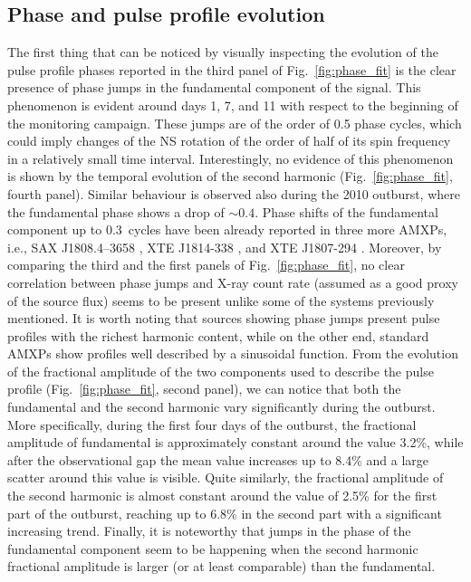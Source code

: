 \documentclass[fleqn,usenatbib]{mnras}
\begin{document}
\subsection{Phase and pulse profile evolution}
The first thing that can be noticed by visually inspecting the evolution of the pulse profile phases reported in the third panel of Fig.~\ref{fig:phase_fit} is the clear presence of phase jumps in the fundamental component of the signal. This phenomenon is evident around days 1, 7, and 11 with respect to the beginning of the monitoring campaign. These jumps are of the order of 0.5 phase cycles, which could imply changes of the NS rotation of the order of half of its spin frequency in a relatively small time interval. Interestingly, no evidence of this phenomenon is shown by the temporal evolution of the second harmonic (Fig.~\ref{fig:phase_fit}, fourth panel). Similar behaviour is observed also during the 2010 outburst, where the fundamental phase shows a drop of $\sim0.4$. Phase shifts of the fundamental component up to 0.3~cycles have been already reported in three more AMXPs, i.e., SAX J1808.4–3658 \citep{Burderi:2006va}, XTE J1814-338 \citep{Papitto:2007wp}, and XTE J1807-294 \citep{Riggio:2008wz,Patruno:2010wi}. Moreover, by comparing the third and the first panels of Fig.~\ref{fig:phase_fit}, no clear correlation between phase jumps and X-ray count rate (assumed as a good proxy of the source flux) seems to be present unlike some of the systems previously mentioned. It is worth noting that sources showing phase jumps present pulse profiles with the richest harmonic content, while on the other end, standard AMXPs show profiles well described by a sinusoidal function. From the evolution of the fractional amplitude of the two components used to describe the pulse profile (Fig.~\ref{fig:phase_fit}, second panel), we can notice that both the fundamental and the second harmonic vary significantly during the outburst. More specifically, during the first four days of the outburst, the fractional amplitude of fundamental is approximately constant around the value 3.2\%, while after the observational gap the mean value increases up to 8.4\% and a large scatter around this value is visible. Quite similarly, the fractional amplitude of the second harmonic is almost constant around the value of 2.5\% for the first part of the outburst, reaching up to 6.8\% in the second part with a significant increasing trend. Finally, it is noteworthy that jumps in the phase of the fundamental component seem to be happening when the second harmonic fractional amplitude is larger (or at least comparable) than the fundamental.   
\end{document}
